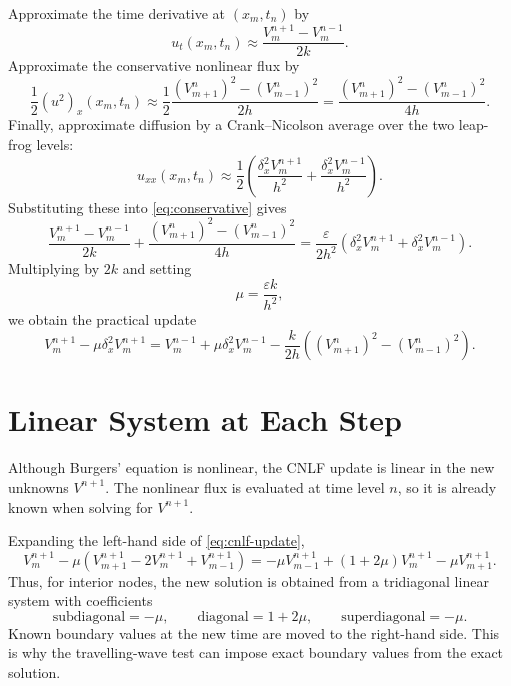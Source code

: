 \documentclass[11pt]{article}
\begin{document}
Approximate the time derivative at $(x_m,t_n)$ by
\begin{equation}
    u_t(x_m,t_n)
    \approx
    \frac{V_m^{n+1}-V_m^{n-1}}{2k}.
\end{equation}
Approximate the conservative nonlinear flux by
\begin{equation}
    \frac12(u^2)_x(x_m,t_n)
    \approx
    \frac{1}{2}
    \frac{(V_{m+1}^n)^2-(V_{m-1}^n)^2}{2h}
    =
    \frac{(V_{m+1}^n)^2-(V_{m-1}^n)^2}{4h}.
\end{equation}
Finally, approximate diffusion by a Crank--Nicolson average over the two leap-frog
levels:
\begin{equation}
    u_{xx}(x_m,t_n)
    \approx
    \frac{1}{2}
    \left(
        \frac{\delta_x^2 V_m^{n+1}}{h^2}
        +
        \frac{\delta_x^2 V_m^{n-1}}{h^2}
    \right).
\end{equation}
Substituting these into \eqref{eq:conservative} gives
\begin{equation}
    \frac{V_m^{n+1}-V_m^{n-1}}{2k}
    +
    \frac{(V_{m+1}^n)^2-(V_{m-1}^n)^2}{4h}
    =
    \frac{\varepsilon}{2h^2}
    \left(
        \delta_x^2V_m^{n+1}
        +
        \delta_x^2V_m^{n-1}
    \right).
    \label{eq:raw-cnlf}
\end{equation}
Multiplying by $2k$ and setting
\begin{equation}
    \mu=\frac{\varepsilon k}{h^2},
\end{equation}
we obtain the practical update
\begin{equation}
    V_m^{n+1}-\mu\delta_x^2V_m^{n+1}
    =
    V_m^{n-1}+\mu\delta_x^2V_m^{n-1}
    -
    \frac{k}{2h}
    \left((V_{m+1}^n)^2-(V_{m-1}^n)^2\right).
    \label{eq:cnlf-update}
\end{equation}

\section{Linear System at Each Step}

Although Burgers' equation is nonlinear, the CNLF update is linear in the new unknowns
$V^{n+1}$.  The nonlinear flux is evaluated at time level $n$, so it is already known
when solving for $V^{n+1}$.

Expanding the left-hand side of \eqref{eq:cnlf-update},
\begin{equation}
    V_m^{n+1}
    -
    \mu
    \left(
        V_{m+1}^{n+1}
        -2V_m^{n+1}
        +V_{m-1}^{n+1}
    \right)
    =
    -\mu V_{m-1}^{n+1}
    +(1+2\mu)V_m^{n+1}
    -\mu V_{m+1}^{n+1}.
\end{equation}
Thus, for interior nodes, the new solution is obtained from a tridiagonal linear
system with coefficients
\begin{equation}
    \text{subdiagonal}=-\mu,
    \qquad
    \text{diagonal}=1+2\mu,
    \qquad
    \text{superdiagonal}=-\mu.
\end{equation}
Known boundary values at the new time are moved to the right-hand side.  This is why
the travelling-wave test can impose exact boundary values from the exact solution.
\end{document}
